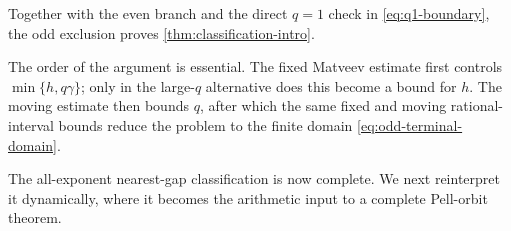 Together with the even branch and the direct $q=1$ check in
\cref{eq:q1-boundary}, the odd exclusion proves
\cref{thm:classification-intro}.

The order of the argument is essential. The fixed Matveev estimate first
controls $\min\{h,q\gamma\}$; only in the large-$q$ alternative does this
become a bound for $h$. The moving estimate then bounds $q$, after which the
same fixed and moving rational-interval bounds reduce the problem to the
finite domain \cref{eq:odd-terminal-domain}.

The all-exponent nearest-gap classification is now complete. We next
reinterpret it dynamically, where it becomes the arithmetic input to a
complete Pell-orbit theorem.

